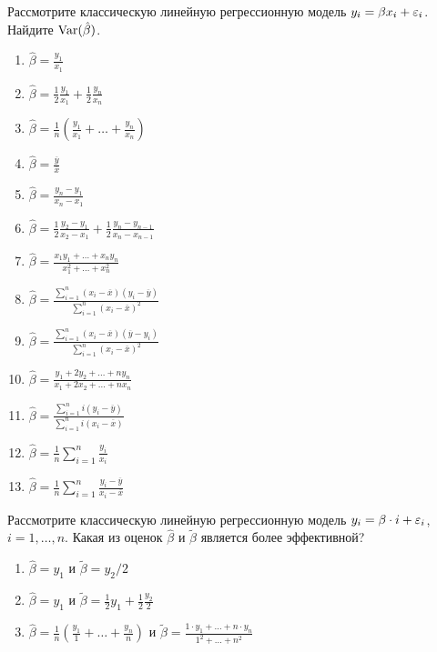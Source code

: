 \documentclass[pdftex,11pt,openany]{book}\usepackage[]{graphicx}\usepackage[]{color}
\begin{document}
\begin{solution}
\end{solution}



\begin{problem}
 Рассмотрите классическую линейную регрессионную модель $y_i = \beta x_i + \varepsilon_i$. Найдите $\operatorname{Var}(\hat{\beta})$.

\begin{enumerate}
\item $\hat{\beta} = \frac{y_1}{x_1}$
\item $\hat{\beta} = \frac{1}{2} \frac{y_1}{x_1} + \frac{1}{2} \frac{y_n}{x_n}$
\item $\hat{\beta} = \frac{1}{n} \left( \frac{y_1}{x_1} + \ldots + \frac{y_n}{x_n} \right)$
\item $\hat{\beta} = \frac{\overline{y}}{\overline{x}}$
\item $\hat{\beta} = \frac{y_n - y_1}{x_n - x_1}$
\item $\hat{\beta} = \frac{1}{2} \frac{y_2 - y_1}{x_2 - x_1} + \frac{1}{2} \frac{y_n - y_{n-1}}{x_n - x_{n-1}}$
\item $\hat{\beta} = \frac{x_1 y_1 + \ldots + x_n y_n}{x_1^2 + \ldots + x_n^2}$
\item $\hat{\beta} = \frac{\sum_{i=1}^n (x_i - \overline{x})(y_i - \overline{y})}{\sum_{i=1}^n (x_i - \bar{x})^2}$
\item $\hat{\beta} = \frac{\sum_{i=1}^n (x_i - \overline{x})(\overline{y} - y_i)}{\sum_{i=1}^n (x_i - \bar{x})^2}$
\item $\hat{\beta} = \frac{y_1 + 2 y_2 + \ldots + n y_n}{x_1 + 2 x_2 + \ldots + n x_n}$
\item $\hat{\beta} = \frac{\sum_{i=1}^n i(y_i - \overline{y})}{\sum_{i=1}^n i(x_i - \overline{x})}$
\item $\hat{\beta} = \frac{1}{n} \sum_{i=1}^n \frac{y_i}{x_i}$
\item $\hat{\beta} = \frac{1}{n} \sum_{i=1}^n \frac{y_i - \overline{y}}{x_i - \overline{x}}$
\end{enumerate}
\end{problem}

\begin{solution}
\end{solution}



\begin{problem}
 Рассмотрите классическую линейную регрессионную модель $y_i = \beta \cdot i + \varepsilon_i$, $i=1, \ldots, n$. Какая из оценок $\hat{\beta}$ и $\tilde{\beta}$ является более эффективной?

\begin{enumerate}
\item $\hat{\beta} = y_1$ и $\tilde{\beta} = y_2/2$
\item $\hat{\beta} = y_1$ и $\tilde{\beta} = \frac{1}{2} y_1 + \frac{1}{2} \frac{y_2}{2}$
\item $\hat{\beta} = \frac{1}{n} \left(  \frac{y_1}{1} + \ldots + \frac{y_n}{n} \right) $ и $\tilde{\beta} = \frac{1 \cdot y_1 + \ldots + n \cdot y_n}{1^2 + \ldots + n^2}$
\end{enumerate} 
\end{problem}
\end{document}
